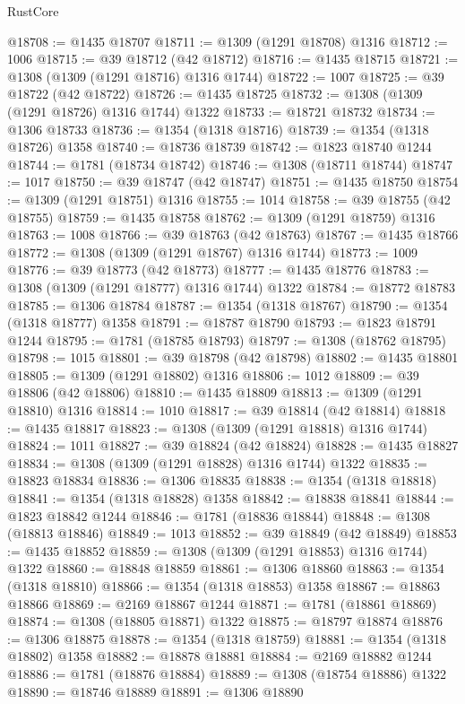 \begin{lexlean}{RustCore}
\begin{coremodule}
@18708 := @1435 @18707
@18711 := @1309 (@1291 @18708) @1316
@18712 := 1006
@18715 := @39 @18712 (@42 @18712)
@18716 := @1435 @18715
@18721 := @1308 (@1309 (@1291 @18716) @1316 @1744)
@18722 := 1007
@18725 := @39 @18722 (@42 @18722)
@18726 := @1435 @18725
@18732 := @1308 (@1309 (@1291 @18726) @1316 @1744) @1322
@18733 := @18721 @18732
@18734 := @1306 @18733
@18736 := @1354 (@1318 @18716)
@18739 := @1354 (@1318 @18726) @1358
@18740 := @18736 @18739
@18742 := @1823 @18740 @1244
@18744 := @1781 (@18734 @18742)
@18746 := @1308 (@18711 @18744)
@18747 := 1017
@18750 := @39 @18747 (@42 @18747)
@18751 := @1435 @18750
@18754 := @1309 (@1291 @18751) @1316
@18755 := 1014
@18758 := @39 @18755 (@42 @18755)
@18759 := @1435 @18758
@18762 := @1309 (@1291 @18759) @1316
@18763 := 1008
@18766 := @39 @18763 (@42 @18763)
@18767 := @1435 @18766
@18772 := @1308 (@1309 (@1291 @18767) @1316 @1744)
@18773 := 1009
@18776 := @39 @18773 (@42 @18773)
@18777 := @1435 @18776
@18783 := @1308 (@1309 (@1291 @18777) @1316 @1744) @1322
@18784 := @18772 @18783
@18785 := @1306 @18784
@18787 := @1354 (@1318 @18767)
@18790 := @1354 (@1318 @18777) @1358
@18791 := @18787 @18790
@18793 := @1823 @18791 @1244
@18795 := @1781 (@18785 @18793)
@18797 := @1308 (@18762 @18795)
@18798 := 1015
@18801 := @39 @18798 (@42 @18798)
@18802 := @1435 @18801
@18805 := @1309 (@1291 @18802) @1316
@18806 := 1012
@18809 := @39 @18806 (@42 @18806)
@18810 := @1435 @18809
@18813 := @1309 (@1291 @18810) @1316
@18814 := 1010
@18817 := @39 @18814 (@42 @18814)
@18818 := @1435 @18817
@18823 := @1308 (@1309 (@1291 @18818) @1316 @1744)
@18824 := 1011
@18827 := @39 @18824 (@42 @18824)
@18828 := @1435 @18827
@18834 := @1308 (@1309 (@1291 @18828) @1316 @1744) @1322
@18835 := @18823 @18834
@18836 := @1306 @18835
@18838 := @1354 (@1318 @18818)
@18841 := @1354 (@1318 @18828) @1358
@18842 := @18838 @18841
@18844 := @1823 @18842 @1244
@18846 := @1781 (@18836 @18844)
@18848 := @1308 (@18813 @18846)
@18849 := 1013
@18852 := @39 @18849 (@42 @18849)
@18853 := @1435 @18852
@18859 := @1308 (@1309 (@1291 @18853) @1316 @1744) @1322
@18860 := @18848 @18859
@18861 := @1306 @18860
@18863 := @1354 (@1318 @18810)
@18866 := @1354 (@1318 @18853) @1358
@18867 := @18863 @18866
@18869 := @2169 @18867 @1244
@18871 := @1781 (@18861 @18869)
@18874 := @1308 (@18805 @18871) @1322
@18875 := @18797 @18874
@18876 := @1306 @18875
@18878 := @1354 (@1318 @18759)
@18881 := @1354 (@1318 @18802) @1358
@18882 := @18878 @18881
@18884 := @2169 @18882 @1244
@18886 := @1781 (@18876 @18884)
@18889 := @1308 (@18754 @18886) @1322
@18890 := @18746 @18889
@18891 := @1306 @18890

\end{coremodule}
\end{lexlean}
